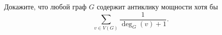 Докажите, что любой граф $G$ содержит антиклику мощности хотя бы
$$\sum\limits_{v \in V(G)} \frac{1}{\operatorname{deg}_{G}(v) + 1}.$$ 